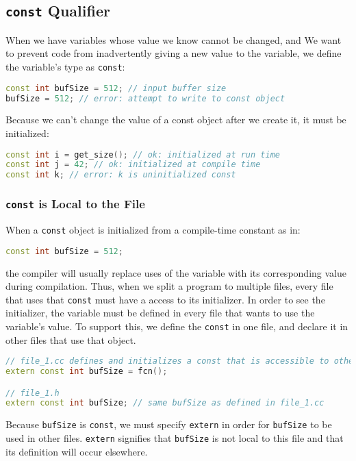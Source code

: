 \subsection{\texttt{const} Qualifier}
\label{task:20231120_cpp}

When we have variables whose value we know cannot be changed, and We want to prevent code from inadvertently giving a new value to the variable, we define the variable's type as \texttt{const}: 
\begin{lstlisting}[language=C++]
const int bufSize = 512; // input buffer size
bufSize = 512; // error: attempt to write to const object
\end{lstlisting}

Because we can't change the value of a const object after we create it, it must be initialized:
\begin{lstlisting}[language=C++]
const int i = get_size(); // ok: initialized at run time 
const int j = 42; // ok: initialized at compile time 
const int k; // error: k is uninitialized const
\end{lstlisting}

\subsubsection*{\texttt{const} is Local to the File}

When a \texttt{const} object is initialized from a compile-time constant as in:
\begin{lstlisting}[language=C++]
const int bufSize = 512;
\end{lstlisting}
the compiler will usually replace uses of the variable with its corresponding value during compilation. Thus, when we split a program to multiple files, every file that uses that \texttt{const} must have a access to its initializer. In order to see the initializer, the variable must be defined in every file that wants to use the variable's value. To support this, we define the \texttt{const} in one file, and declare it in other files that use that object.
\begin{lstlisting}[language=C++]
// file_1.cc defines and initializes a const that is accessible to other files 
extern const int bufSize = fcn(); 

// file_1.h 
extern const int bufSize; // same bufSize as defined in file_1.cc
\end{lstlisting}
Because \texttt{bufSize} is \texttt{const}, we must specify \texttt{extern} in order for \texttt{bufSize} to be used in other files. \texttt{extern} signifies that \texttt{bufSize} is not local to this file and that its definition will occur elsewhere.

